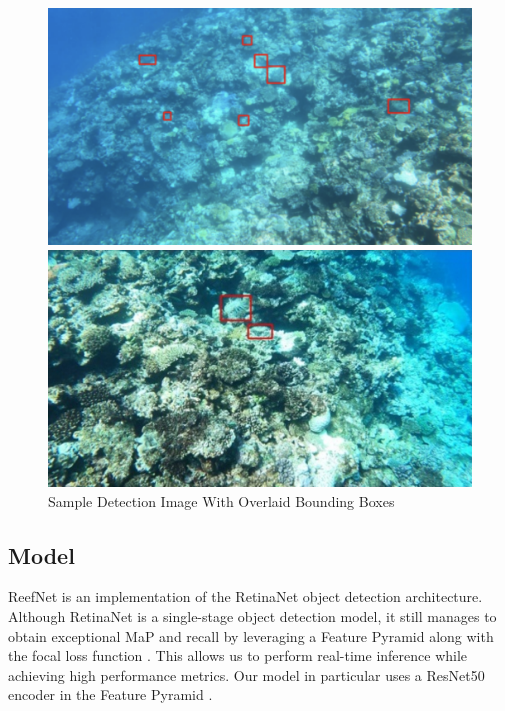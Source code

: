 \documentclass{article}
\begin{document}
\begin{figure}[!ht]
    \begin{minipage}{0.48\textwidth}
    \centering
    \includegraphics[width=\textwidth]{demo_image.png}
    \end{minipage}
    \begin{minipage}{0.48\textwidth}
    \centering
    \includegraphics[width=\textwidth]{demo_image_2.jpg}
    \end{minipage}
    \caption{Sample Detection Image With Overlaid Bounding Boxes}
    \label{fig:sample_data}
\end{figure}


\subsection{Model}
ReefNet is an implementation of the RetinaNet object detection architecture.
Although RetinaNet is a single-stage object detection model, it still manages to obtain exceptional MaP and recall by leveraging a Feature Pyramid along with the focal loss function \cite{retinanet}.
This allows us to perform real-time inference while achieving high performance metrics.
Our model in particular uses a ResNet50 encoder in the Feature Pyramid \cite{feature_pyramid}\cite{resnet}.
\end{document}
